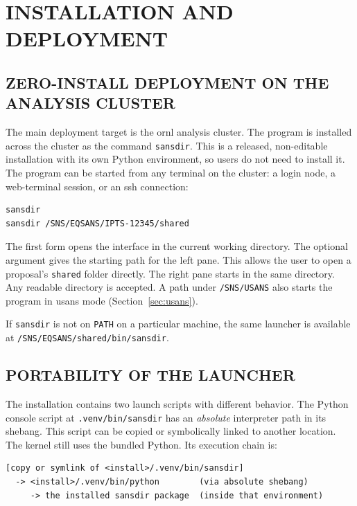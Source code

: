 \documentclass[tm]{ornltm}
\begin{document}
\section{INSTALLATION AND DEPLOYMENT}
\label{sec:install}

\subsection{ZERO-INSTALL DEPLOYMENT ON THE ANALYSIS CLUSTER}

The main deployment target is the \ac{ornl} analysis cluster. The program is
installed across the cluster as the command \texttt{sansdir}. This is a
released, non-editable installation with its own Python environment, so users do
not need to install it. The program can be started from any terminal on the
cluster: a login node, a web-terminal session, or an \ac{ssh} connection:

\begin{lstlisting}[language=shellsession]
sansdir
sansdir /SNS/EQSANS/IPTS-12345/shared
\end{lstlisting}

The first form opens the interface in the current working directory. The
optional argument gives the starting path for the left pane. This allows the
user to open a proposal's \texttt{shared} folder directly. The right pane starts
in the same directory. Any readable directory is accepted. A path under
\texttt{/SNS/USANS} also starts the program in \ac{usans} mode
(Section~\ref{sec:usans}).

If \texttt{sansdir} is not on \texttt{PATH} on a particular machine, the same
launcher is available at \texttt{/SNS/EQSANS/shared/bin/sansdir}.

\subsection{PORTABILITY OF THE LAUNCHER}

The installation contains two launch scripts with different behavior. The
Python console script at \texttt{.venv/bin/sansdir} has an \emph{absolute}
interpreter path in its shebang. This script can be copied or symbolically linked
to another location. The kernel still uses the bundled Python. Its execution
chain is:

\begin{lstlisting}
[copy or symlink of <install>/.venv/bin/sansdir]
  -> <install>/.venv/bin/python        (via absolute shebang)
     -> the installed sansdir package  (inside that environment)
\end{lstlisting}
\end{document}
